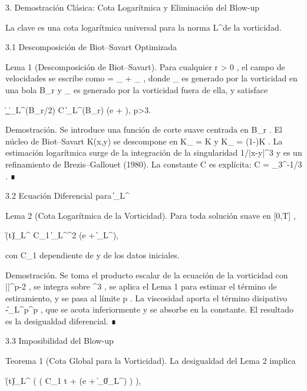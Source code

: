 \documentclass[12pt,a4paper]{book}
\begin{document}
3. Demostración Clásica: Cota Logarítmica y Eliminación del Blow-up

La clave es una cota logarítmica universal para la norma  L^\infty  de la vorticidad.

3.1 Descomposición de Biot–Savart Optimizada

Lema 1 (Descomposición de Biot–Savart).
Para cualquier  r > 0 , el campo de velocidades se escribe como   = _{} + _{} , donde  _{}  es generado por la vorticidad en una bola  B_r  y  _{}  es generado por la vorticidad fuera de ella, y satisface

\|\nabla {}_{}\|_{L^\infty(B_{r/2})} \le C \|\boldsymbol{\omega}\|_{L^\infty(B_r)} \log\left(e + \right), \quad p>3.

Demostración. Se introduce una función de corte suave  \chi  centrada en  B_r . El núcleo de Biot–Savart  K(x,y)  se descompone en  K_{} = \chi K  y  K_{} = (1-\chi)K . La estimación logarítmica surge de la integración de la singularidad  1/|x-y|^3  y es un refinamiento de Brezis–Gallouet (1980). La constante  C  es explícita:  C = \omega_3^{-1/3} . ∎

3.2 Ecuación Diferencial para  \|\boldsymbol{\omega}\|_{L^\infty} 

Lema 2 (Cota Logarítmica de la Vorticidad).
Para toda solución suave en  [0,T] ,

\|\boldsymbol{\omega}(t)\|_{L^\infty} \le C_1 \|\boldsymbol{\omega}\|_{L^\infty}^2 \log(e + \|\boldsymbol{\omega}\|_{L^\infty}),

con  C_1  dependiente de  \nu  y de los datos iniciales.

Demostración. Se toma el producto escalar de la ecuación de la vorticidad con  |\boldsymbol{\omega}|^{p-2}\boldsymbol{\omega} , se integra sobre  ^3 , se aplica el Lema 1 para estimar el término de estiramiento, y se pasa al límite  p \to \infty . La viscosidad aporta el término disipativo  -\nu \|\nabla \boldsymbol{\omega}\|_{L^p}^p , que se acota inferiormente y se absorbe en la constante. El resultado es la desigualdad diferencial. ∎

3.3 Imposibilidad del Blow-up

Teorema 1 (Cota Global para la Vorticidad).
La desigualdad del Lema 2 implica

\|\boldsymbol{\omega}(t)\|_{L^\infty} \le \exp\left( \exp\left( C_1 t + \ln\ln(e + \|\boldsymbol{\omega}_0\|_{L^\infty}) \right) \right),
\end{document}
